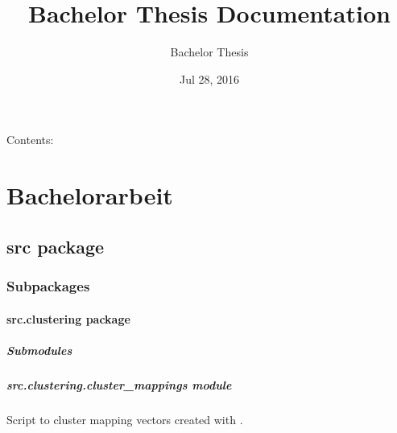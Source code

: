 \documentclass[letterpaper,10pt,english]{sphinxmanual}
\title{Bachelor Thesis Documentation}
\date{Jul 28, 2016}
\author{Bachelor Thesis}
\begin{document}
\maketitle
\tableofcontents
{}\label{index::doc}


Contents:


\chapter{Bachelorarbeit}
\label{index:bachelorarbeit}\label{index:welcome-to-bachelor-thesis-s-documentation}

\section{src package}
\label{src::doc}\label{src:src-package}

\subsection{Subpackages}
\label{src:subpackages}

\subsubsection{src.clustering package}
\label{src.clustering:src-clustering-package}\label{src.clustering::doc}

\paragraph{Submodules}
\label{src.clustering:submodules}

\paragraph{src.clustering.cluster\_mappings module}
\label{src.clustering:module-src.clustering.cluster_mappings}\label{src.clustering:src-clustering-cluster-mappings-module}
Script to cluster mapping vectors created with {\hyperref[src.mapping:module\string-src.mapping.mapthreading]{}}.
\end{document}
